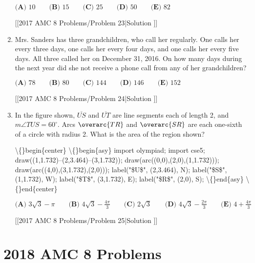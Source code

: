 \documentclass{article}
\begin{document}
\begin{enumerate}[label=\arabic*., itemsep=0.5em]
\(\textbf{(A) }10\qquad\textbf{(B) }15\qquad\textbf{(C) }25\qquad\textbf{(D) }50\qquad\textbf{(E) }82\)

[[2017 AMC 8 Problems/Problem 23|Solution
]]\par \vspace{0.5em}\item Mrs. Sanders has three grandchildren, who call her regularly. One calls her every three days, one calls her every four days, and one calls her every five days. All three called her on December 31, 2016. On how many days during the next year did she not receive a phone call from any of her grandchildren?

\(\textbf{(A) }78\qquad\textbf{(B) }80\qquad\textbf{(C) }144\qquad\textbf{(D) }146\qquad\textbf{(E) }152\)

[[2017 AMC 8 Problems/Problem 24|Solution
]]\par \vspace{0.5em}\item In the figure shown, \(\overline{US}\) and \(\overline{UT}\) are line segments each of length 2, and \(m\angle TUS = 60^\circ\). Arcs \(\overarc{TR}\) and \(\overarc{SR}\) are each one-sixth of a circle with radius 2. What is the area of the region shown?


\textbackslash\{\}begin\{center\}
\textbackslash\{\}begin\{asy\}
import olympiad;
import cse5;
draw((1,1.732)--(2,3.464)--(3,1.732)); draw(arc((0,0),(2,0),(1,1.732))); draw(arc((4,0),(3,1.732),(2,0))); label("\$U\$", (2,3.464), N); label("\$S\$", (1,1.732), W); label("\$T\$", (3,1.732), E); label("\$R\$", (2,0), S);
\textbackslash\{\}end\{asy\}
\textbackslash\{\}end\{center\}

\(\textbf{(A) }3\sqrt{3}-\pi\qquad\textbf{(B) }4\sqrt{3}-\frac{4\pi}{3}\qquad\textbf{(C) }2\sqrt{3}\qquad\textbf{(D) }4\sqrt{3}-\frac{2\pi}{3}\qquad\textbf{(E) }4+\frac{4\pi}{3}\)

[[2017 AMC 8 Problems/Problem 25|Solution
]]\par \vspace{0.5em}\end{enumerate}\newpage\section*{2018 AMC 8 Problems}
\end{document}
